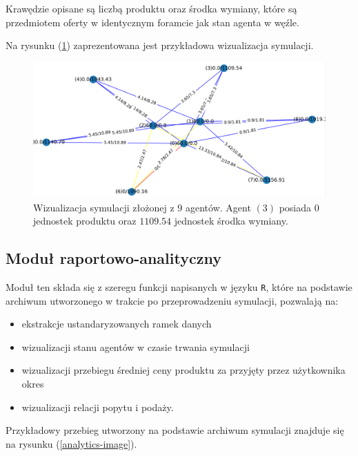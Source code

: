 \documentclass{article}
\begin{document}
Krawędzie opisane są liczbą produktu oraz środka wymiany, które są przedmiotem oferty w identycznym foramcie jak stan agenta w węźle. 

Na rysunku (\ref{vis-image}) zaprezentowana jest przykładowa wizualizacja symulacji.

\begin{figure}[H]
	\centering
	\includegraphics[width=\textwidth, height=0.4\textheight]{./vis-image.png}
	\caption{Wizualizacja symulacji złożonej z 9 agentów. Agent $(3)$ posiada 0 jednostek produktu oraz $1109.54$ jednostek środka wymiany.}
	\label{vis-image}
\end{figure}
\subsection{Moduł raportowo-analityczny}

Moduł ten składa się z szeregu funkcji napisanych w języku \texttt{R}, które na podstawie archiwum utworzonego w trakcie po przeprowadzeniu symulacji, pozwalają na:

\begin{itemize}
	\item ekstrakcje ustandaryzowanych ramek danych
	\item wizualizacji stanu agentów w czasie trwania symulacji
	\item wizualizacji przebiegu średniej ceny produktu za przyjęty przez użytkownika okres
	\item wizualizacji relacji popytu i podaży.
\end{itemize}

Przykładowy przebieg utworzony na podstawie archiwum symulacji znajduje się na rysunku (\ref{analytics-image}).
\end{document}
